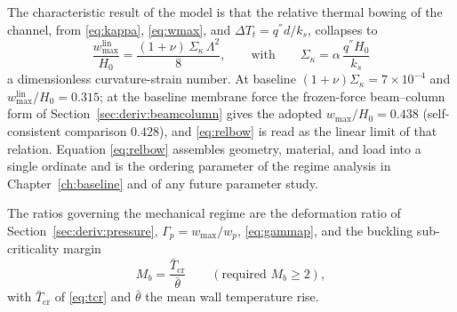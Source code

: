 The characteristic result of the model is that the relative thermal bowing of the channel,
from \eqref{eq:kappa}, \eqref{eq:wmax}, and $\Delta T_t=q^{''}d/k_s$, collapses to
\begin{equation}
\frac{w_{\max}^{\mathrm{lin}}}{H_0}=\frac{(1+\nu)\,\Sigma_\kappa\,\Lambda^2}{8},
\qquad\text{with}\qquad
\Sigma_\kappa=\alpha\,\frac{q^{''}H_0}{k_s}
\label{eq:relbow}
\end{equation}
a dimensionless curvature-strain number. At baseline $(1+\nu)\Sigma_\kappa=7\times10^{-4}$ and
$w_{\max}^{\mathrm{lin}}/H_0=0.315$; at the baseline membrane force the frozen-force
beam--column form of Section~\ref{sec:deriv:beamcolumn} gives the adopted
$w_{\max}/H_0=0.438$ (self-consistent comparison $0.428$), and \eqref{eq:relbow} is read as
the linear limit of that relation. Equation \eqref{eq:relbow} assembles geometry, material, and
load into a single ordinate and is the ordering parameter of the regime analysis in
Chapter~\ref{ch:baseline} and of any future parameter study.

The ratios governing the mechanical regime are the deformation ratio of
Section~\ref{sec:deriv:pressure},
$\Gamma_p=w_{\max}/w_p$, \eqref{eq:gammap}, and the buckling sub-criticality margin
\begin{equation}
M_b=\frac{\bar T_{\mathrm{cr}}}{\bar\theta}\qquad(\text{required } M_b\ge2) ,
\end{equation}
with $\bar T_{\mathrm{cr}}$ of \eqref{eq:tcr} and $\bar\theta$ the mean wall temperature rise.

